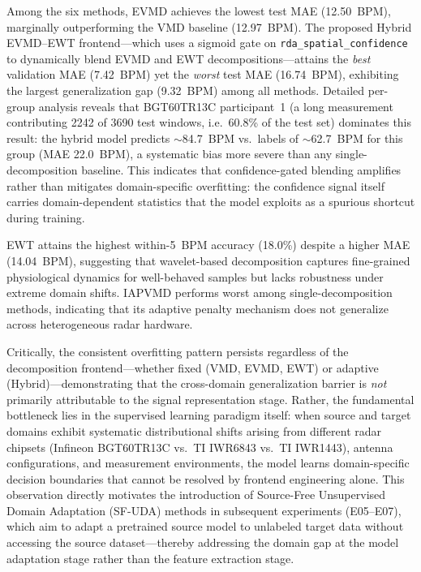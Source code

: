Among the six methods, EVMD achieves the lowest test MAE (12.50~BPM), marginally outperforming the VMD baseline (12.97~BPM). The proposed Hybrid EVMD--EWT frontend---which uses a sigmoid gate on \texttt{rda\_spatial\_confidence} to dynamically blend EVMD and EWT decompositions---attains the \emph{best} validation MAE (7.42~BPM) yet the \emph{worst} test MAE (16.74~BPM), exhibiting the largest generalization gap (9.32~BPM) among all methods. Detailed per-group analysis reveals that BGT60TR13C participant~1 (a long measurement contributing 2242 of 3690 test windows, i.e.\ 60.8\% of the test set) dominates this result: the hybrid model predicts $\sim$84.7~BPM vs.\ labels of $\sim$62.7~BPM for this group (MAE 22.0~BPM), a systematic bias more severe than any single-decomposition baseline. This indicates that confidence-gated blending amplifies rather than mitigates domain-specific overfitting: the confidence signal itself carries domain-dependent statistics that the model exploits as a spurious shortcut during training.

EWT attains the highest within-5~BPM accuracy (18.0\%) despite a higher MAE (14.04~BPM), suggesting that wavelet-based decomposition captures fine-grained physiological dynamics for well-behaved samples but lacks robustness under extreme domain shifts. IAPVMD performs worst among single-decomposition methods, indicating that its adaptive penalty mechanism does not generalize across heterogeneous radar hardware.

Critically, the consistent overfitting pattern persists regardless of the decomposition frontend---whether fixed (VMD, EVMD, EWT) or adaptive (Hybrid)---demonstrating that the cross-domain generalization barrier is \emph{not} primarily attributable to the signal representation stage. Rather, the fundamental bottleneck lies in the supervised learning paradigm itself: when source and target domains exhibit systematic distributional shifts arising from different radar chipsets (Infineon BGT60TR13C vs.\ TI IWR6843 vs.\ TI IWR1443), antenna configurations, and measurement environments, the model learns domain-specific decision boundaries that cannot be resolved by frontend engineering alone. This observation directly motivates the introduction of Source-Free Unsupervised Domain Adaptation (SF-UDA) methods in subsequent experiments (E05--E07), which aim to adapt a pretrained source model to unlabeled target data without accessing the source dataset---thereby addressing the domain gap at the model adaptation stage rather than the feature extraction stage.

